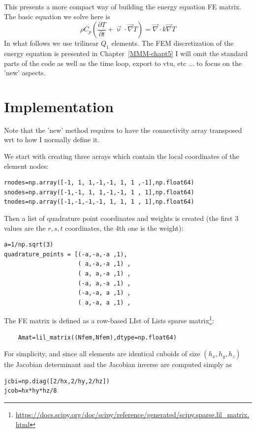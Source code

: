 
This \stone presents a more compact way of building the energy equation
FE matrix. 
The basic equation we solve here is
\[
\rho C_p \left( \frac{\partial T}{\partial t} + \vec\upnu \cdot \vec\nabla T \right)
= \vec\nabla \cdot k \vec\nabla T 
\]
In what follows we use trilinear $Q_1$ elements.
The FEM discretization of the energy equation is presented in Chapter~\ref{MMM-chapt5}
I will omit the standard parts of the code as well as the time loop, export to vtu, etc ...
to focus on the 'new' aspects.

\section*{Implementation}

Note that the 'new' method requires to have the connectivity 
array transposed wrt to how I normally define it.

We start with creating three arrays which contain 
the local coordinates of the element nodes:
\begin{lstlisting}
rnodes=np.array([-1, 1, 1,-1,-1, 1, 1 ,-1],np.float64)
snodes=np.array([-1,-1, 1, 1,-1,-1, 1 , 1],np.float64)
tnodes=np.array([-1,-1,-1,-1, 1, 1, 1 , 1],np.float64)
\end{lstlisting}

Then a list of quadrature point coordinates and weights is created
(the first 3 values are the $r,s,t$ coordinates, the 4th one is the weight):
\begin{lstlisting}
a=1/np.sqrt(3)
quadrature_points = [(-a,-a,-a ,1),
                     ( a,-a,-a ,1) , 
                     ( a, a,-a ,1) ,
                     (-a, a,-a ,1) ,
                     (-a,-a, a ,1) , 
                     ( a,-a, a ,1) , 
\end{lstlisting}

The FE matrix is defined as a row-based LIst of Lists sparse 
matrix\footnote{\url{https://docs.scipy.org/doc/scipy/reference/generated/scipy.sparse.lil_matrix.html}}:
\begin{lstlisting}
    Amat=lil_matrix((Nfem,Nfem),dtype=np.float64)
\end{lstlisting}

For simplicity, and since all elements are identical cuboids of size $(h_x,h_y,h_z)$
the Jacobian determinant and the Jacobian inverse are computed simply as
\begin{lstlisting}
jcbi=np.diag([2/hx,2/hy,2/hz])
jcob=hx*hy*hz/8
\end{lstlisting}

